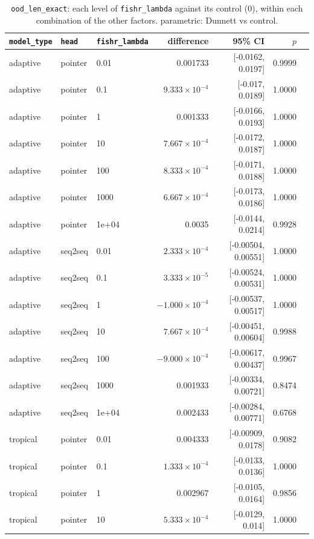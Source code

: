 \documentclass[10pt]{article}
\begin{document}
{\small
\begin{longtable}{lllrrrl}
\caption{\texttt{ood\_len\_exact}: each level of \texttt{fishr\_lambda} against its control (0), within each combination of the other factors. parametric: Dunnett vs control.}\label{tab:control-ood_len_exact}\\
\toprule
\texttt{model\_type} & \texttt{head} & \texttt{fishr\_lambda} & difference & 95\% CI & $p$ & \\
\midrule
\endhead
adaptive & pointer & 0.01 & 0.001733 & [-0.0162, 0.0197] & 0.9999 & \\
adaptive & pointer & 0.1 & $9.333\times10^{-4}$ & [-0.017, 0.0189] & 1.0000 & \\
adaptive & pointer & 1 & 0.001333 & [-0.0166, 0.0193] & 1.0000 & \\
adaptive & pointer & 10 & $7.667\times10^{-4}$ & [-0.0172, 0.0187] & 1.0000 & \\
adaptive & pointer & 100 & $8.333\times10^{-4}$ & [-0.0171, 0.0188] & 1.0000 & \\
adaptive & pointer & 1000 & $6.667\times10^{-4}$ & [-0.0173, 0.0186] & 1.0000 & \\
adaptive & pointer & 1e+04 & 0.0035 & [-0.0144, 0.0214] & 0.9928 & \\
adaptive & seq2seq & 0.01 & $2.333\times10^{-4}$ & [-0.00504, 0.00551] & 1.0000 & \\
adaptive & seq2seq & 0.1 & $3.333\times10^{-5}$ & [-0.00524, 0.00531] & 1.0000 & \\
adaptive & seq2seq & 1 & $-1.000\times10^{-4}$ & [-0.00537, 0.00517] & 1.0000 & \\
adaptive & seq2seq & 10 & $7.667\times10^{-4}$ & [-0.00451, 0.00604] & 0.9988 & \\
adaptive & seq2seq & 100 & $-9.000\times10^{-4}$ & [-0.00617, 0.00437] & 0.9967 & \\
adaptive & seq2seq & 1000 & 0.001933 & [-0.00334, 0.00721] & 0.8474 & \\
adaptive & seq2seq & 1e+04 & 0.002433 & [-0.00284, 0.00771] & 0.6768 & \\
tropical & pointer & 0.01 & 0.004333 & [-0.00909, 0.0178] & 0.9082 & \\
tropical & pointer & 0.1 & $1.333\times10^{-4}$ & [-0.0133, 0.0136] & 1.0000 & \\
tropical & pointer & 1 & 0.002967 & [-0.0105, 0.0164] & 0.9856 & \\
tropical & pointer & 10 & $5.333\times10^{-4}$ & [-0.0129, 0.014] & 1.0000 & \\

\end{longtable}}
\end{document}
